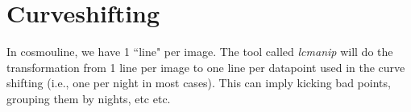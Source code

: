 

\section{Curveshifting}

In cosmouline, we have 1 ``line" per image. The tool called \emph{lcmanip} will do the transformation from 1 line per image to one line per datapoint used in the curve shifting (i.e., one per night in most cases). This can imply kicking bad points, grouping them by nights, etc etc.

